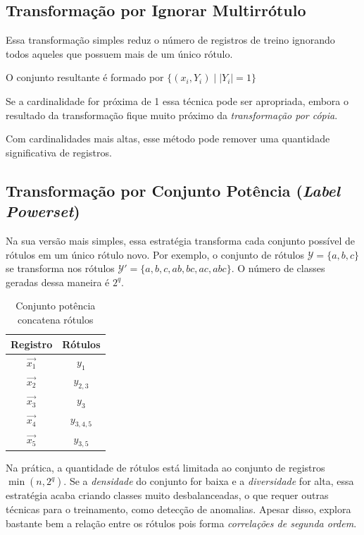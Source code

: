 \documentclass[runningheads,a4paper]{llncs}
\begin{document}
\subsection{Transformação por Ignorar Multirrótulo} \label{subsec:ignorarmultirrotulo}

Essa transformação simples reduz o número de registros de treino ignorando todos aqueles que possuem mais de um único rótulo.

O conjunto resultante é formado por $\{ (x_i, Y_i) \mid |Y_i| = 1 \}$


Se a cardinalidade for próxima de 1 essa técnica pode ser apropriada, embora o resultado da transformação fique muito próximo da \textit{transformação por cópia}.

Com cardinalidades mais altas, esse método pode remover uma quantidade significativa de registros.

\subsection{Transformação por Conjunto Potência (\textit{Label Powerset})} \label{subsec:conjuntopotencia}

Na sua versão mais simples, essa estratégia transforma cada conjunto possível de rótulos em um único rótulo novo. Por exemplo, o conjunto de rótulos $\mathcal{Y} = \{a, b, c\}$ se transforma nos rótulos $\mathcal{Y'} = \{a, b, c, ab, bc, ac, abc\}$. O número de classes geradas dessa maneira é $2^q$.

\begin{table}
	\centering
	\begin{tabular}{| c | c |}
		\hline
		\textbf{Registro} & \textbf{Rótulos} \\
		\hline
		$\vec{x_1}$ & $y_1$ \\
		\hline
		$\vec{x_2}$ & $y_{2, 3}$ \\
		\hline
		$\vec{x_3}$ & $y_3$ \\
		\hline
		$\vec{x_4}$ & $y_{3, 4, 5}$ \\
		\hline
		$\vec{x_5}$ & $y_{3, 5}$ \\
		\hline
	\end{tabular}
	\caption{Conjunto potência concatena rótulos}
	\label{tab:expotencia}
\end{table}


Na prática, a quantidade de rótulos está limitada ao conjunto de registros $\min(n, 2^q)$. Se a \textit{densidade} do conjunto for baixa e a \textit{diversidade} for alta, essa estratégia acaba criando classes muito desbalanceadas, o que requer outras técnicas para o treinamento, como detecção de anomalias. Apesar disso, explora bastante bem a relação entre os rótulos \cite{Read2008-bt} pois forma \textit{correlações de segunda ordem}.
\end{document}
